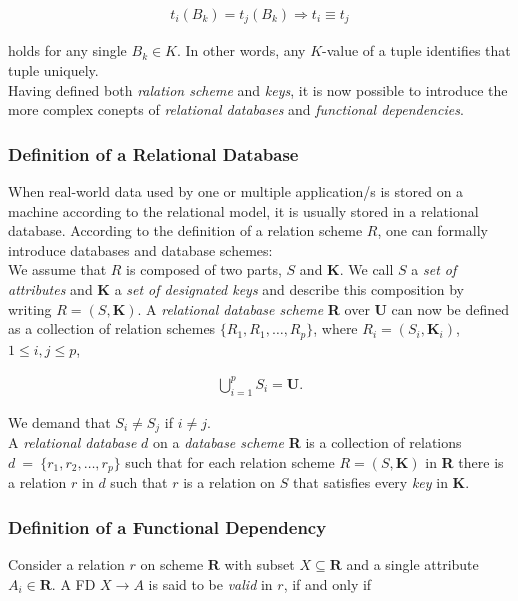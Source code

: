\begin{align*}
    t_i(B_k) = t_j(B_k) \Rightarrow t_i \equiv t_j
\end{align*}

holds for any single \( B_k \in K \). In other words, any \( K \)-value of a tuple identifies that tuple uniquely.~\cite[p.~4]{MAI83} \\

Having defined both \emph{ralation scheme} and \emph{keys}, it is now possible to introduce the more complex conepts of \emph{relational databases} and \emph{functional dependencies}.


\subsubsection{Definition of a Relational Database}
When real-world data used by one or multiple application/s is stored on a machine according to the relational model, it is usually stored in a relational database.
According to the definition of a relation scheme \(R\), one can formally introduce databases and database schemes: \\

We assume that \(R\) is composed of two parts, \(S\) and \(\boldsymbol{K}\). We call \(S\) a \emph{set of attributes} and \(\boldsymbol{K}\) a \emph{set of designated keys} and describe this composition by writing \(R = (S, \boldsymbol{K})\).
A \emph{relational database scheme} \textbf{R} over \textbf{U} can now be defined as a collection of relation schemes \(\{R_1, R_1, \dots, R_p\}\), where \(R_i = (S_i, \boldsymbol{K}_i)\), \(1 \leq i, j \leq p\),

\begin{align*}
    \bigcup^{p}_{i=1} S_i = \boldsymbol{U}.
\end{align*}

We demand that \(S_i \neq S_j\) if \(i \neq j\). \\

A \emph{relational database} \( d \) on a \emph{database scheme} \textbf{R} is a collection of relations \( d~=~\{r_1, r_2, \dots, r_p \} \) such that for each relation scheme \(R = (S, \boldsymbol{K}) \) in \textbf{R} there is a relation \(r\) in \(d\) such that \(r\) is a relation on \(S\) that satisfies every \emph{key} in \(\boldsymbol{K}\).~\cite[p.~94]{MAI83}


\subsubsection{Definition of a Functional Dependency}
Consider a relation \(r\) on scheme \(\boldsymbol{R}\) with subset \(X \subseteq \boldsymbol{R}\) and a single attribute \(A_i \in \boldsymbol{R}\).
A FD \(X \to A\) is said to be \emph{valid} in \(r\), if and only if

